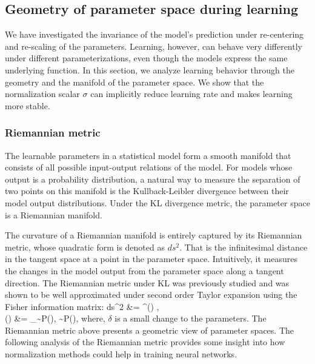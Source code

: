 \documentclass{article}
\begin{document}
\subsection{Geometry of parameter space during learning}
We have investigated the invariance of the model's prediction under re-centering and re-scaling of the parameters. Learning, however, can behave very differently under different parameterizations, even though the models express the same underlying function. In this section, we analyze learning behavior through the geometry and the manifold of the parameter space. We show that the normalization scalar $\sigma$ can implicitly reduce learning rate and makes learning more stable.

\subsubsection{Riemannian metric}
The learnable parameters in a statistical model form a smooth manifold that consists of all possible input-output relations of the model. For models whose output is a probability distribution, a natural way to measure the separation of two points on this manifold is the Kullback-Leibler divergence between their model output distributions. Under the KL divergence metric, the parameter space is a Riemannian manifold.

The curvature of a Riemannian manifold is entirely captured by its Riemannian metric, whose quadratic form is denoted as $ds^2$. That is the infinitesimal distance in the tangent space at a point in the parameter space. Intuitively, it measures the changes in the model output from the parameter space along a tangent direction. The Riemannian metric under KL was previously studied \citep{amari1998natural} and was shown to be well approximated under second order Taylor expansion using the Fisher information matrix: 
\bea
ds^2 &= \kldiv{} \approx {} \delta^\T \fisher(\theta) \delta, \\
\fisher(\theta) &= \expectation_{\data \sim P(\data), \target \sim P(\target\given\data)},
\eea
where, $\delta$ is a small change to the parameters. The Riemannian metric above presents a geometric view of parameter spaces. The following analysis of the Riemannian metric provides some insight into how normalization methods could help in training neural networks.
\end{document}
